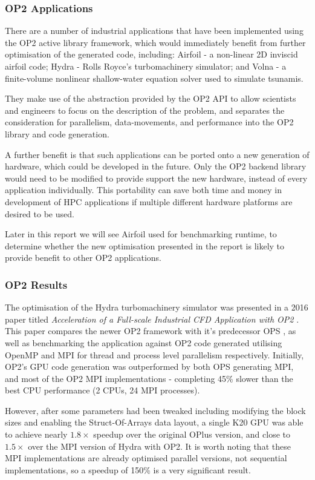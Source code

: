 \subsubsection{OP2 Applications}
There are a number of industrial applications that have been implemented using the OP2 active library framework, which would immediately benefit from further optimisation of the generated code, including: Airfoil \cite{airfoil} - a non-linear 2D inviscid airfoil code; Hydra \cite{hydra} - Rolls Royce’s turbomachinery simulator; and Volna \cite{volna} - a finite-volume nonlinear shallow-water equation solver used to simulate tsunamis.
\par
They make use of the abstraction provided by the OP2 API to allow scientists and engineers to focus on the description of the problem, and separates the consideration for parallelism, data-movements, and performance into the OP2 library and code generation.
\par
A further benefit is that such applications can be ported onto a new generation of hardware, which could be developed in the future. Only the OP2 backend library would need to be modified to provide support the new hardware, instead of every application individually. This portability can save both time and money in development of HPC applications if multiple different hardware platforms are desired to be used.
\par
Later in this report we will see Airfoil used for benchmarking runtime, to determine whether the new optimisation presented in the report is likely to provide benefit to other OP2 applications.

\subsubsection{OP2 Results}
The optimisation of the Hydra turbomachinery simulator was presented in a 2016 paper titled \textit{Acceleration of a Full-scale Industrial CFD Application with OP2} \cite{hydrapaper}. This paper compares the newer OP2 framework with it's predecessor OPS \cite{ops}, as well as benchmarking the application against OP2 code generated utilising OpenMP \cite{OpenMP} and MPI \cite{MPI} for thread and process level parallelism respectively. Initially, OP2's GPU code generation was outperformed by both OPS generating MPI, and most of the OP2 MPI implementations - completing 45\% slower than the best CPU performance (2 CPUs, 24 MPI processes).
\par However, after some parameters had been tweaked including modifying the block sizes and enabling the Struct-Of-Arrays data layout, a single K20 GPU was able to achieve nearly $1.8\times$ speedup over the original OPlus version, and close to $1.5\times$ over the MPI version of Hydra with OP2. It is worth noting that these MPI implementations are already optimised parallel versions, not sequential implementations, so a speedup of 150\% is a very significant result.
\clearpage

